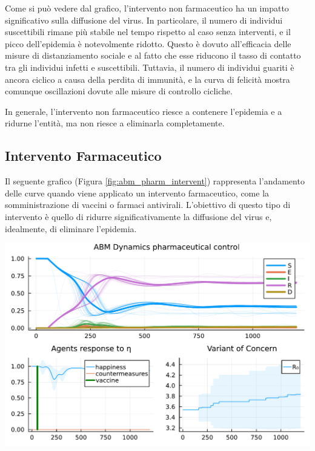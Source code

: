 Come si può vedere dal grafico, l'intervento non farmaceutico 
ha un impatto significativo sulla diffusione del virus. 
In particolare, il numero di individui suscettibili rimane 
più stabile nel tempo rispetto al caso senza interventi, e il 
picco dell'epidemia è notevolmente ridotto. Questo è dovuto 
all'efficacia delle misure di distanziamento sociale e al fatto 
che esse riducono il tasso di contatto tra gli individui infetti 
e suscettibili. Tuttavia, il numero di individui guariti è ancora 
ciclico a causa della perdita di immunità, e la curva di felicità 
mostra comunque oscillazioni dovute alle misure di controllo cicliche.

In generale, l'intervento non farmaceutico riesce a contenere 
l'epidemia e a ridurne l'entità, ma non riesce a eliminarla 
completamente.

\subsection{Intervento Farmaceutico}

Il seguente grafico (Figura \ref{fig:abm_pharm_intervent}) 
rappresenta l'andamento delle curve quando viene applicato un 
intervento farmaceutico, come la somministrazione di vaccini o 
farmaci antivirali. L'obiettivo di questo tipo di intervento è 
quello di ridurre significativamente la diffusione del virus e, 
idealmente, di eliminare l'epidemia.

\begin{minipage}{\linewidth}
    \centering
    \includegraphics[width=\textwidth]{img/SocialNetworkABM_VACCINE.pdf}
    \label{fig:abm_pharm_intervent}
\end{minipage}

